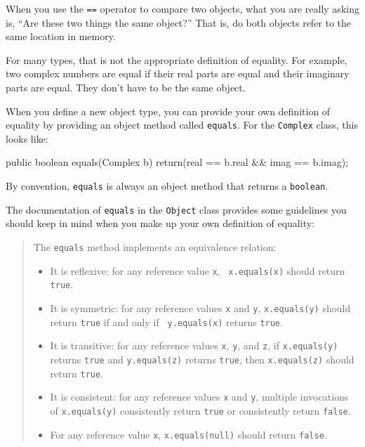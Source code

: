 \documentclass{book}
\begin{document}
When you use the {\tt ==} operator to compare two objects,
what you are really asking is, ``Are these two things the same
object?''  That is, do both objects refer to the same location
in memory.

For many types, that is not the appropriate definition of
equality.  For example, two complex numbers are equal if their
real parts are equal and their imaginary parts are equal.  They
don't have to be the same object.


When you define a new object type, you can provide your own
definition of equality by providing an object method called
{\tt equals}.  For the {\tt Complex} class, this looks like:

\begin{verbatimtab}
public boolean equals(Complex b) {
    return(real == b.real && imag == b.imag);
}
\end{verbatimtab}
%
By convention, {\tt equals} is always an object method that
returns a {\tt boolean}.

The documentation of {\tt equals} in the {\tt Object} class
provides some guidelines you should keep in mind when you
make up your own definition of equality:

\begin{quote}

The {\tt equals} method implements an equivalence relation: 


\begin{itemize}

\item It is reflexive: for any reference value {\tt x}, {\tt
x.equals(x)} should return {\tt true}.

\item It is symmetric: for any reference values {\tt x} and {\tt y},
{\tt x.equals(y)} should return {\tt true} if and only if {\tt
y.equals(x)} returns {\tt true}.

\item It is transitive: for any reference values {\tt x}, {\tt y}, and
{\tt z}, if {\tt x.equals(y)} returns {\tt true} and {\tt y.equals(z)}
returns {\tt true}, then {\tt x.equals(z)} should return {\tt true}.

\item It is consistent: for any reference values {\tt x} and {\tt y},
multiple invocations of {\tt x.equals(y)} consistently return {\tt true} or
consistently return {\tt false}.

\item For any reference value {\tt x}, {\tt x.equals(null)} should
return {\tt false}.

\end{itemize}

\end{quote}
\end{document}
